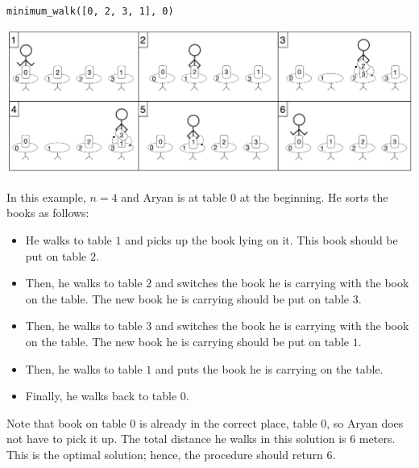 \texttt{minimum\_walk([0, 2, 3, 1], 0)}

\includegraphics[scale=0.5]{books.png}

In this example, $n=4$ and Aryan is at table $0$ at the beginning.
He sorts the books as follows:
\begin{itemize}
\item He walks to table $1$ and picks up the book lying on it. This book should be put on table $2$.
\item Then, he walks to table $2$ and switches the book he is carrying with the book on the table.
The new book he is carrying should be put on table $3$.
\item Then, he walks to table $3$ and switches the book he is carrying with the book on the table.
The new book he is carrying should be put on table $1$.
\item Then, he walks to table $1$ and puts the book he is carrying on the table.
\item Finally, he walks back to table $0$.
\end{itemize}

Note that book on table $0$ is already in the correct place, table $0$, so Aryan does not have to pick it up.
The total distance he walks in this solution is $6$ meters.
This is the optimal solution; hence, the procedure should return $6$.